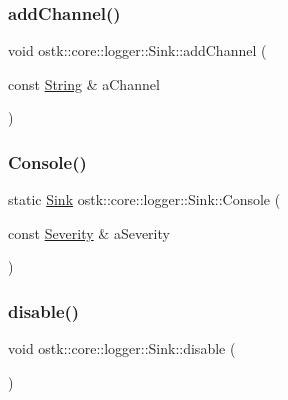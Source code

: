\subsubsection{\texorpdfstring{add\+Channel()}{addChannel()}}
{\footnotesize\ttfamily void ostk\+::core\+::logger\+::\+Sink\+::add\+Channel (\begin{DoxyParamCaption}\item[{const \hyperlink{classostk_1_1core_1_1types_1_1_string}{String} \&}]{a\+Channel }\end{DoxyParamCaption})}

\mbox{\label{classostk_1_1core_1_1logger_1_1_sink_a363d47c4b76945b5aa75f0b21b7740c2}} 
\subsubsection{\texorpdfstring{Console()}{Console()}}
{\footnotesize\ttfamily static \hyperlink{classostk_1_1core_1_1logger_1_1_sink}{Sink} ostk\+::core\+::logger\+::\+Sink\+::\+Console (\begin{DoxyParamCaption}\item[{const \hyperlink{namespaceostk_1_1core_1_1logger_a52d02954e094391f067befffe7f3cae9}{Severity} \&}]{a\+Severity }\end{DoxyParamCaption})\hspace{0.3cm}{\ttfamily [static]}}

\mbox{\label{classostk_1_1core_1_1logger_1_1_sink_a0ab42f184deb76938ae3ab97f690fbaf}} 
\subsubsection{\texorpdfstring{disable()}{disable()}}
{\footnotesize\ttfamily void ostk\+::core\+::logger\+::\+Sink\+::disable (\begin{DoxyParamCaption}{ }\end{DoxyParamCaption})}

\mbox{\label{classostk_1_1core_1_1logger_1_1_sink_aba09f6fd4b47c6dbcf755834ea531c17}} 
